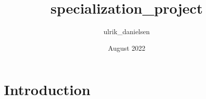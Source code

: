 \documentclass{article}
\title{specialization_project}
\author{ulrik_danielsen }
\date{August 2022}
\begin{document}
\maketitle

\section{Introduction}
\end{document}
